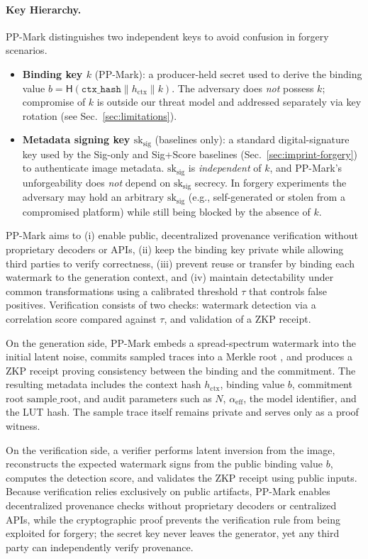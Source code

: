 \documentclass{article}
\theoremstyle{plain}
\theoremstyle{definition}
\theoremstyle{remark}
\begin{document}
\paragraph{Key Hierarchy.} PP-Mark distinguishes two independent keys to avoid confusion in forgery scenarios.
\begin{itemize}
  \item \textbf{Binding key $k$} (PP-Mark): a producer-held secret used to derive the binding value $b = \mathsf{H}(\texttt{ctx\_hash} \| h_{\mathrm{ctx}} \| k)$. The adversary does \emph{not} possess $k$; compromise of $k$ is outside our threat model and addressed separately via key rotation (see Sec.~\ref{sec:limitations}).
  \item \textbf{Metadata signing key $\mathrm{sk_{sig}}$} (baselines only): a standard digital-signature key used by the Sig-only and Sig+Score baselines (Sec.~\ref{sec:imprint-forgery}) to authenticate image metadata. $\mathrm{sk_{sig}}$ is \emph{independent} of $k$, and PP-Mark's unforgeability does \emph{not} depend on $\mathrm{sk_{sig}}$ secrecy. In forgery experiments the adversary may hold an arbitrary $\mathrm{sk_{sig}}$ (e.g., self-generated or stolen from a compromised platform) while still being blocked by the absence of $k$.
\end{itemize}

PP-Mark aims to (i) enable public, decentralized provenance verification without proprietary decoders or APIs, (ii) keep the binding key private while allowing third parties to verify correctness, (iii) prevent reuse or transfer by binding each watermark to the generation context, and (iv) maintain detectability under common transformations using a calibrated threshold \(\tau\) that controls false positives. Verification consists of two checks: watermark detection via a correlation score compared against \(\tau\), and validation of a ZKP receipt.

On the generation side, PP-Mark embeds a spread-spectrum watermark into the initial latent noise, commits sampled traces into a Merkle root \cite{merkle87}, and produces a ZKP receipt proving consistency between the binding and the commitment. The resulting metadata includes the context hash \(h_{\mathrm{ctx}}\), binding value \(b\), commitment root \(\mathrm{sample\_root}\), and audit parameters such as \(N\), \(\alpha_{\mathrm{eff}}\), the model identifier, and the LUT hash. The sample trace itself remains private and serves only as a proof witness.

On the verification side, a verifier performs latent inversion from the image, reconstructs the expected watermark signs from the public binding value \(b\), computes the detection score, and validates the ZKP receipt using public inputs. Because verification relies exclusively on public artifacts, PP-Mark enables decentralized provenance checks without proprietary decoders or centralized APIs, while the cryptographic proof prevents the verification rule from being exploited for forgery; the secret key never leaves the generator, yet any third party can independently verify provenance.
\end{document}

